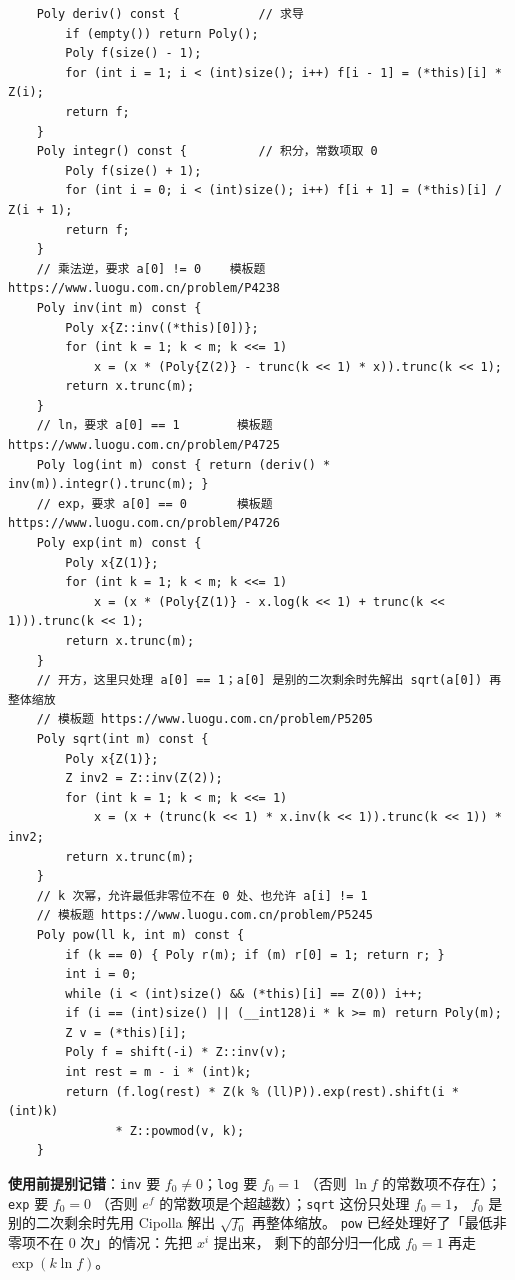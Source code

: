 		\begin{verbatim}
    Poly deriv() const {           // 求导
        if (empty()) return Poly();
        Poly f(size() - 1);
        for (int i = 1; i < (int)size(); i++) f[i - 1] = (*this)[i] * Z(i);
        return f;
    }
    Poly integr() const {          // 积分，常数项取 0
        Poly f(size() + 1);
        for (int i = 0; i < (int)size(); i++) f[i + 1] = (*this)[i] / Z(i + 1);
        return f;
    }
    // 乘法逆，要求 a[0] != 0    模板题 https://www.luogu.com.cn/problem/P4238
    Poly inv(int m) const {
        Poly x{Z::inv((*this)[0])};
        for (int k = 1; k < m; k <<= 1)
            x = (x * (Poly{Z(2)} - trunc(k << 1) * x)).trunc(k << 1);
        return x.trunc(m);
    }
    // ln，要求 a[0] == 1        模板题 https://www.luogu.com.cn/problem/P4725
    Poly log(int m) const { return (deriv() * inv(m)).integr().trunc(m); }
    // exp，要求 a[0] == 0       模板题 https://www.luogu.com.cn/problem/P4726
    Poly exp(int m) const {
        Poly x{Z(1)};
        for (int k = 1; k < m; k <<= 1)
            x = (x * (Poly{Z(1)} - x.log(k << 1) + trunc(k << 1))).trunc(k << 1);
        return x.trunc(m);
    }
    // 开方，这里只处理 a[0] == 1；a[0] 是别的二次剩余时先解出 sqrt(a[0]) 再整体缩放
    // 模板题 https://www.luogu.com.cn/problem/P5205
    Poly sqrt(int m) const {
        Poly x{Z(1)};
        Z inv2 = Z::inv(Z(2));
        for (int k = 1; k < m; k <<= 1)
            x = (x + (trunc(k << 1) * x.inv(k << 1)).trunc(k << 1)) * inv2;
        return x.trunc(m);
    }
    // k 次幂，允许最低非零位不在 0 处、也允许 a[i] != 1
    // 模板题 https://www.luogu.com.cn/problem/P5245
    Poly pow(ll k, int m) const {
        if (k == 0) { Poly r(m); if (m) r[0] = 1; return r; }
        int i = 0;
        while (i < (int)size() && (*this)[i] == Z(0)) i++;
        if (i == (int)size() || (__int128)i * k >= m) return Poly(m);
        Z v = (*this)[i];
        Poly f = shift(-i) * Z::inv(v);
        int rest = m - i * (int)k;
        return (f.log(rest) * Z(k % (ll)P)).exp(rest).shift(i * (int)k)
               * Z::powmod(v, k);
    }
		\end{verbatim}

		\textbf{使用前提别记错}：\texttt{inv} 要 $f_0 \neq 0$；\texttt{log} 要 $f_0 = 1$
		（否则 $\ln f$ 的常数项不存在）；\texttt{exp} 要 $f_0 = 0$
		（否则 $e^{f}$ 的常数项是个超越数）；\texttt{sqrt} 这份只处理 $f_0 = 1$，
		$f_0$ 是别的二次剩余时先用 Cipolla 解出 $\sqrt{f_0}$ 再整体缩放。
		\texttt{pow} 已经处理好了「最低非零项不在 $0$ 次」的情况：先把 $x^i$ 提出来，
		剩下的部分归一化成 $f_0 = 1$ 再走 $\exp(k \ln f)$。

